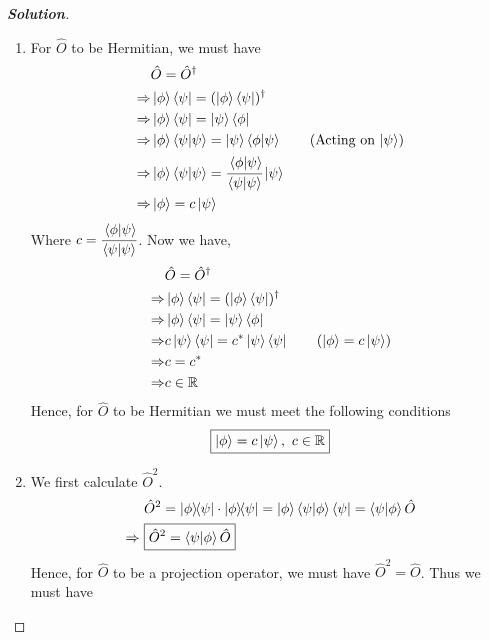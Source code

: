 \documentclass[10pt]{scrartcl}
\theoremstyle{definition}
\newenvironment{solution} {\begin{proof}[\normalfont \textbf{Solution}]} {\end{proof}}
\newcommand{\rn}{\mathbb{R}}
\newcommand*{\OO}{\hat{O}}
\begin{document}
\begin{solution}
    $ $
    \begin{enumerate}[label={(\alph*)}]
        \item For $\hat{O}$ to be Hermitian, we must have 
            \begin{align*}
                &\hat{O} = \hat{O}^\dagger \\ 
                \Rightarrow &\ket{\phi} \bra{\psi} = (\ket{\phi} \bra{\psi})^\dagger \\
                \Rightarrow &\ket{\phi} \bra{\psi} = \ket{\psi} \bra{\phi} \\
                \Rightarrow &\ket{\phi} \bra{\psi} \ket{\psi} = \ket{\psi} \bra{\phi} \ket{\psi} \tag{Acting on $\ket{\psi}$}\\
                \Rightarrow &\ket{\phi} \bra{\psi} \ket{\psi} = \cfrac{\ip{\phi}{\psi}}{\ip{\psi}{\psi}} \ket{\psi}\\
                \Rightarrow &\ket{\phi} = c\ket{\psi} \\
            \end{align*}
            Where $c = \cfrac{\ip{\phi}{\psi}}{\ip{\psi}{\psi}}$. Now we have, 
            \begin{align*}
                &\hat{O} = \hat{O}^\dagger \\ 
                \Rightarrow &\ket{\phi} \bra{\psi} = (\ket{\phi} \bra{\psi})^\dagger \\
                \Rightarrow &\ket{\phi} \bra{\psi} = \ket{\psi} \bra{\phi} \\
                \Rightarrow &c\ket{\psi} \bra{\psi} = c^*\ket{\psi} \bra{\psi} \tag{$\ket{\phi} = c\ket{\psi}$}\\
                \Rightarrow &c = c^* \\ 
                \Rightarrow &c \in \rn
            \end{align*}
            Hence, for $\OO$ to be Hermitian we must meet the following conditions $$\boxed{\ket{\phi} = c\ket{\psi}, ~ c \in \rn}$$
        \item We first calculate $\OO^2$. 
            \begin{align*}
                &\OO^2 = \op{\phi}{\psi} \cdot \op{\phi}{\psi} = \ket{\phi} \ip{\psi}{\phi} \bra{\psi} = \ip{\psi}{\phi} \OO \\ 
                \Rightarrow ~ &\boxed{\OO^2 = \ip{\psi}{\phi} \OO}
            \end{align*}
            Hence, for $\OO$ to be a projection operator, we must have $\OO^2 = \OO$. Thus we must have 

\end{enumerate}
\end{solution}
\end{document}
